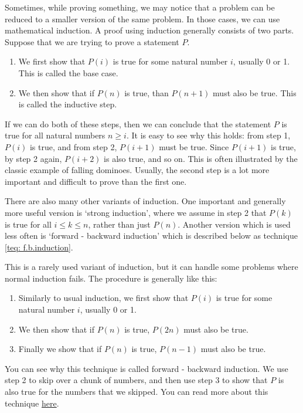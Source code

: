 \begin{technique}
    \label{teq: induction}
    Sometimes, while proving something, we may notice that a problem can be reduced to a smaller version of the same problem. In those cases, we can use mathematical induction. A proof using induction generally consists of two parts. Suppose that we are trying to prove a statement $P$.
    \begin{enumerate}
        \item We first show that $P(i)$ is true for some natural number $i$, usually 0 or 1. This is called the base case. 
        \item We then show that if $P(n)$ is true, than $P(n + 1)$ must also be true. This is called the inductive step.
    \end{enumerate}
    If we can do both of these steps, then we can conclude that the statement $P$ is true for all natural numbers $n \geq i$. It is easy to see why this holds: from step 1, $P(i)$ is true, and from step 2, $P(i + 1)$ must be true. Since $P(i + 1)$ is true, by step 2 again, $P(i + 2)$ is also true, and so on. This is often illustrated by the classic example of falling dominoes. Usually, the second step is a lot more important and difficult to prove than the first one. 

    There are also many other variants of induction. One important and generally more useful version is `strong induction', where we assume in step 2 that $P(k)$ is true for all $i \leq k \leq n$, rather than just $P(n)$. Another version which is used less often is `forward - backward induction' which is described below as technique \ref{teq: f.b.induction}.
\end{technique}

\begin{technique}
    \label{teq: f.b.induction}
    This is a rarely used variant of induction, but it can handle some problems where normal induction fails. The procedure is generally like this:
    \begin{enumerate}
        \item Similarly to usual induction, we first show that $P(i)$ is true for some natural number $i$, usually 0 or 1.

        \item We then show that if $P(n)$ is true, $P(2n)$ must also be true.

        \item Finally we show that if $P(n)$ is true, $P(n - 1)$ must also be true.
    \end{enumerate}
    You can see why this technique is called forward - backward induction. We use step 2 to skip over a chunk of numbers, and then use step 3 to show that $P$ is also true for the numbers that we skipped. You can read more about this technique \href{https://brilliant.org/wiki/forward-backwards-induction/}{here}. 
\end{technique}
\begin{technique}
    \label{teq: SFFT}
\end{technique}